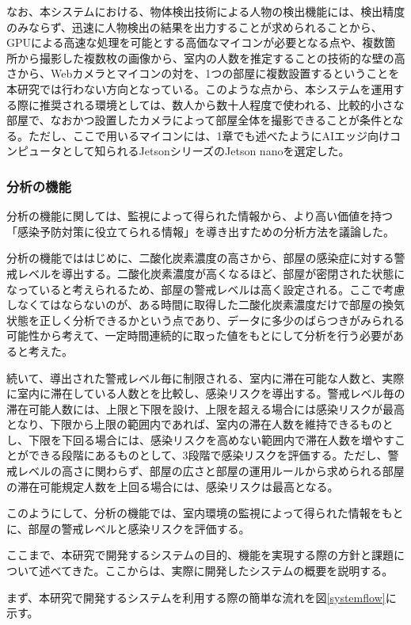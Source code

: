 なお、本システムにおける、物体検出技術による人物の検出機能には、検出精度のみならず、迅速に人物検出の結果を出力することが求められることから、GPUによる高速な処理を可能とする高価なマイコンが必要となる点や、複数箇所から撮影した複数枚の画像から、室内の人数を推定することの技術的な壁の高さから、Webカメラとマイコンの対を、1つの部屋に複数設置するということを本研究では行わない方向となっている。このような点から、本システムを運用する際に推奨される環境としては、数人から数十人程度で使われる、比較的小さな部屋で、なおかつ設置したカメラによって部屋全体を撮影できることが条件となる。ただし、ここで用いるマイコンには、1章でも述べたようにAIエッジ向けコンピュータとして知られるJetsonシリーズのJetson nanoを選定した。

\subsubsection*{分析の機能}

分析の機能に関しては、監視によって得られた情報から、より高い価値を持つ「感染予防対策に役立てられる情報」を導き出すための分析方法を議論した。

分析の機能でははじめに、二酸化炭素濃度の高さから、部屋の感染症に対する警戒レベルを導出する。二酸化炭素濃度が高くなるほど、部屋が密閉された状態になっていると考えられるため、部屋の警戒レベルは高く設定される。ここで考慮しなくてはならないのが、ある時間に取得した二酸化炭素濃度だけで部屋の換気状態を正しく分析できるかという点であり、データに多少のばらつきがみられる可能性から考えて、一定時間連続的に取った値をもとにして分析を行う必要があると考えた。

続いて、導出された警戒レベル毎に制限される、室内に滞在可能な人数と、実際に室内に滞在している人数とを比較し、感染リスクを導出する。警戒レベル毎の滞在可能人数には、上限と下限を設け、上限を超える場合には感染リスクが最高となり、下限から上限の範囲内であれば、室内の滞在人数を維持できるものとし、下限を下回る場合には、感染リスクを高めない範囲内で滞在人数を増やすことができる段階にあるものとして、3段階で感染リスクを評価する。ただし、警戒レベルの高さに関わらず、部屋の広さと部屋の運用ルールから求められる部屋の滞在可能規定人数を上回る場合には、感染リスクは最高となる。

このようにして、分析の機能では、室内環境の監視によって得られた情報をもとに、部屋の警戒レベルと感染リスクを評価する。

ここまで、本研究で開発するシステムの目的、機能を実現する際の方針と課題について述べてきた。ここからは、実際に開発したシステムの概要を説明する。

まず、本研究で開発するシステムを利用する際の簡単な流れを図\ref{systemflow}に示す。


